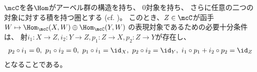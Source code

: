 \documentclass[uplatex,dvipdfmx]{jsarticle}
\begin{document}
\maketitle
\HeaderCommentA
\section{}
\fi


\begin{prob}\label{1.3}
  \(\mcC\)を各\(\Hom\)がアーベル群の構造を持ち、
  \(0\)対象を持ち、
  さらに任意の二つの対象に対する積を持つ圏とする
  (cf. \cite[Definition 1.2.1 (i),(ii),(iii)]{kashiwara2002sheaves})。
  このとき、\(Z\in \mcC\)が函手
  \(W\mapsto \Hom_{\mcC}(X,W)\oplus \Hom_{\mcC}(Y,W)\)
  の表現対象であるための必要十分条件は、
  射\(i_1:X\to Z, i_2:Y\to Z, p_1: Z\to X, p_2:Z\to Y\)が存在し、
  \begin{align*}
    p_2\circ i_1 = 0, \ p_1 \circ i_2 = 0, \
    p_1\circ i_1 = \id_X, \ p_2\circ i_2 = \id_Y, \
    i_1\circ p_1 + i_2 \circ p_2 = \id_Z
  \end{align*}
  となることである。
\end{prob}
\end{document}
